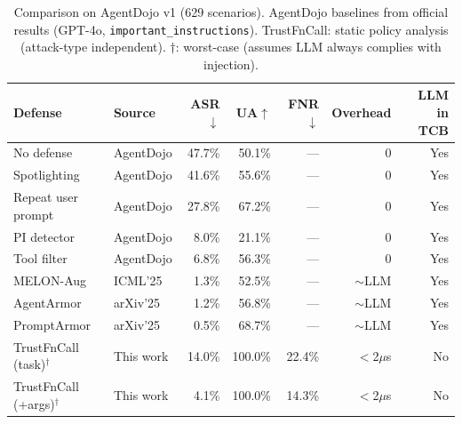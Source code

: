 \begin{table}[t]
\centering
\caption{Comparison on AgentDojo v1 (629 scenarios). AgentDojo baselines from official results (GPT-4o, \texttt{important\_instructions}). TrustFnCall: static policy analysis (attack-type independent). $\dagger$: worst-case (assumes LLM always complies with injection).}
\label{tab:comparison}
\small
\begin{tabular}{llrrrrr}
\toprule
\textbf{Defense} & \textbf{Source} & \textbf{ASR$\downarrow$} & \textbf{UA$\uparrow$} & \textbf{FNR$\downarrow$} & \textbf{Overhead} & \textbf{LLM in TCB} \\
\midrule
  No defense & AgentDojo & 47.7\% & 50.1\% & --- & 0 & Yes \\
  Spotlighting & AgentDojo & 41.6\% & 55.6\% & --- & 0 & Yes \\
  Repeat user prompt & AgentDojo & 27.8\% & 67.2\% & --- & 0 & Yes \\
  PI detector & AgentDojo & 8.0\% & 21.1\% & --- & 0 & Yes \\
  Tool filter & AgentDojo & 6.8\% & 56.3\% & --- & 0 & Yes \\
  MELON-Aug & ICML'25 & 1.3\% & 52.5\% & --- & $\sim$LLM & Yes \\
  AgentArmor & arXiv'25 & 1.2\% & 56.8\% & --- & $\sim$LLM & Yes \\
  PromptArmor & arXiv'25 & 0.5\% & 68.7\% & --- & $\sim$LLM & Yes \\
\midrule
  TrustFnCall (task)$^\dagger$ & This work & 14.0\% & 100.0\% & 22.4\% & $<$2$\mu$s & No \\
  TrustFnCall (+args)$^\dagger$ & This work & 4.1\% & 100.0\% & 14.3\% & $<$2$\mu$s & No \\
\bottomrule
\end{tabular}
\end{table}